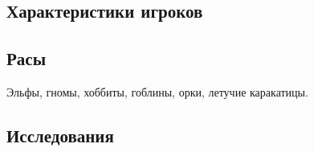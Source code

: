 \documentclass[a4paper,12pt]{article}
\begin{document}
    \subsection{Характеристики игроков}

    \subsection{Расы}

      Эльфы, гномы, хоббиты, гоблины, орки, летучие каракатицы.

    \subsection{Исследования}
\end{document}
